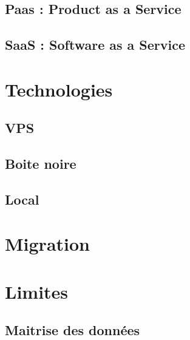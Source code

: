 \documentclass[11pt]{book}
\begin{document}
\subsection{Paas : Product as a Service}\label{sec-paas---product-as-a-service}%

\subsection{SaaS    : Software as a Service}\label{sec-saas---software-as-a-service}%

\section{Technologies}\label{sec-technologies}%

\subsection{VPS}\label{sec-vps}%

\subsection{Boite noire}\label{sec-boite-noire}%

\subsection{Local}\label{sec-local}%

\section{Migration}\label{sec-migration}%

\section{Limites}\label{sec-limites}%

\subsection{Maitrise des données}\label{sec-maitrise-des-donnes}%
\end{document}
